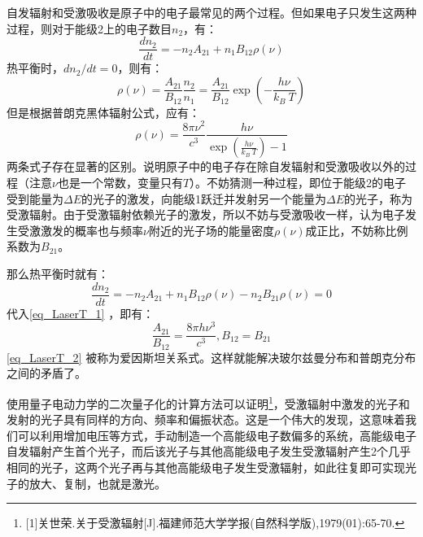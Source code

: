自发辐射和受激吸收是原子中的电子最常见的两个过程。但如果电子只发生这两种过程，则对于能级2上的电子数目$n_2$，有：
\begin{equation}
\frac{dn_2}{dt}=-n_2A_{21}+n_1B_{12}\rho(\nu)
\end{equation}
热平衡时，$dn_2/dt=0$，则有：
\begin{equation}
\rho(\nu)=\frac{A_{21}}{B_{12}}\frac{n_2}{n_1}=\frac{A_{21}}{B_{12}}\exp(-\frac{h\nu}{k_B \ T})
\end{equation}
但是根据普朗克黑体辐射公式，应有：
\begin{equation}\label{eq_LaserT_1}
\rho(\nu)=\frac{8\pi\nu^2}{c^3}\frac{h\nu}{\exp(\frac{h\nu}{k_B\ T})-1}
\end{equation}
两条式子存在显著的区别。说明原子中的电子存在除自发辐射和受激吸收以外的过程（注意$\nu$也是一个常数，变量只有$T$）。不妨猜测一种过程，即位于能级2的电子受到能量为$\Delta E$的光子的激发，向能级1跃迁并发射另一个能量为$\Delta E$的光子，称为受激辐射。由于受激辐射依赖光子的激发，所以不妨与受激吸收一样，认为电子发生受激激发的概率也与频率$\nu$附近的光子场的能量密度$\rho(\nu)$成正比，不妨称比例系数为$B_{21}$。

那么热平衡时就有：
\begin{equation}
\frac{dn_2}{dt}=-n_2A_{21}+n_1B_{12}\rho(\nu)-n_2B_{21}\rho(\nu)=0
\end{equation}
代入\autoref{eq_LaserT_1} ，即有：
\begin{equation}\label{eq_LaserT_2}
\frac{A_{21}}{B_{12}}=\frac{8\pi h\nu^3}{c^3},B_{12}=B_{21}
\end{equation}
\autoref{eq_LaserT_2} 被称为爱因斯坦关系式。这样就能解决玻尔兹曼分布和普朗克分布之间的矛盾了。

使用量子电动力学的二次量子化的计算方法可以证明\footnote{[1]关世荣.关于受激辐射[J].福建师范大学学报(自然科学版),1979(01):65-70.}，受激辐射中激发的光子和发射的光子具有同样的方向、频率和偏振状态。这是一个伟大的发现，这意味着我们可以利用增加电压等方式，手动制造一个高能级电子数偏多的系统，高能级电子自发辐射产生首个光子，而后该光子与其他高能级电子发生受激辐射产生2个几乎相同的光子，这两个光子再与其他高能级电子发生受激辐射，如此往复即可实现光子的放大、复制，也就是激光。
